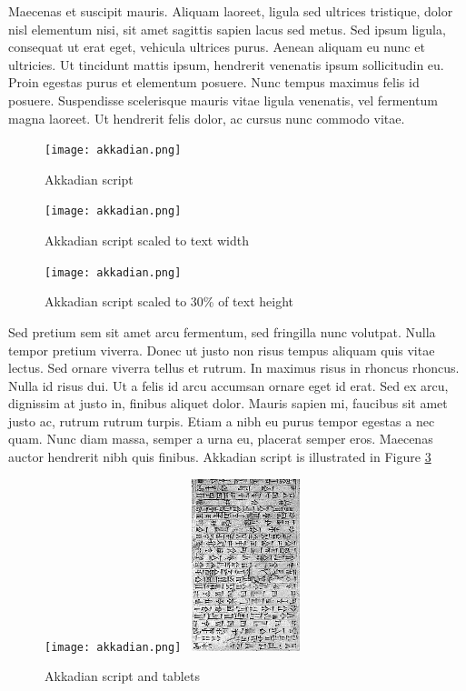 Maecenas et suscipit mauris. Aliquam laoreet, ligula sed ultrices tristique, dolor nisl elementum nisi, sit amet sagittis sapien lacus sed metus. Sed ipsum ligula, consequat ut erat eget, vehicula ultrices purus. Aenean aliquam eu nunc et ultricies. Ut tincidunt mattis ipsum, hendrerit venenatis ipsum sollicitudin eu. Proin egestas purus et elementum posuere. Nunc tempus maximus felis id posuere. Suspendisse scelerisque mauris vitae ligula venenatis, vel fermentum magna laoreet. Ut hendrerit felis dolor, ac cursus nunc commodo vitae.


\begin{figure} 
\texttt{[image: akkadian.png]}
\caption{Akkadian script}
\label{fig:akkadianscript}
\end{figure}


\begin{figure} 
\texttt{[image: akkadian.png]}
\caption{Akkadian script scaled to text width}
\label{fig:akkadianscript}
\end{figure}


\begin{figure} 
\texttt{[image: akkadian.png]}
\caption{Akkadian script scaled to 30\% of text height}
\label{fig:akkadianscript}
\end{figure}


Sed pretium sem sit amet arcu fermentum, sed fringilla nunc volutpat. Nulla tempor pretium viverra. Donec ut justo non risus tempus aliquam quis vitae lectus. Sed ornare viverra tellus et rutrum. In maximus risus in rhoncus rhoncus. Nulla id risus dui. Ut a felis id arcu accumsan ornare eget id erat. Sed ex arcu, dignissim at justo in, finibus aliquet dolor. Mauris sapien mi, faucibus sit amet justo ac, rutrum rutrum turpis. Etiam a nibh eu purus tempor egestas a nec quam. Nunc diam massa, semper a urna eu, placerat semper eros. Maecenas auctor hendrerit nibh quis finibus. 
Akkadian script is illustrated in Figure \ref{fig:akkadianscript}


\begin{figure} 
\texttt{[image: akkadian.png]}~
\includegraphics[height=5cm]{tablet.jpg}

\caption{Akkadian script and tablets}
\end{figure}



